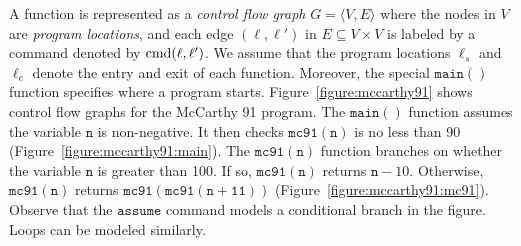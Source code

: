 A function is represented as a \emph{control flow graph} $G = \langle
V, E \rangle$ where the nodes in $V$ are \emph{program locations}, and
each edge $(\ell, \ell')$ in $E \subseteq V \times V$ is labeled by a
command denoted by $\textmd{cmd} (\ell, \ell')$. We
assume that the program locations $\ell_s$ and $\ell_e$ denote the
entry and exit of each function. Moreover, the special
$\mathtt{main()}$ function specifies where a program starts.
Figure~\ref{figure:mccarthy91} shows control flow graphs for the
McCarthy 91 program. The $\mathtt{main()}$ function assumes the
variable $\mathtt{n}$ is non-negative. It then checks
$\mathtt{mc91(n)}$ is no less than 90
(Figure~\ref{figure:mccarthy91:main}). The $\mathtt{mc91(n)}$ function
branches on whether the variable $\mathtt{n}$ is greater than 100. If
so, $\mathtt{mc91(n)}$ returns $\mathtt{n} - 10$. Otherwise,
$\mathtt{mc91(n)}$ returns $\mathtt{mc91(mc91(n + 11))}$
(Figure~\ref{figure:mccarthy91:mc91}). Observe that the
$\mathtt{assume}$ command models a conditional branch in the
figure. Loops can be modeled similarly.

